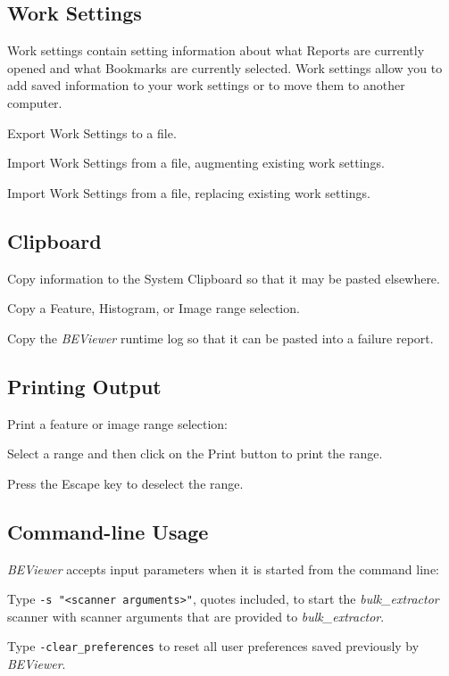 \documentclass[10pt,twoside]{article}
\newcommand{\bulk}{\emph{bulk\_extractor}\xspace}
\newcommand{\bev}{\emph{BEViewer}\xspace}
\begin{document}
\subsection{Work Settings}
Work settings contain setting information
about what Reports are currently opened and what Bookmarks are currently selected.
Work settings allow you to add saved information to your work settings
or to move them to another computer.
\begin{compactitem}
\item Export Work Settings to a file.
\item Import Work Settings from a file, augmenting existing work settings.
\item Import Work Settings from a file, replacing existing work settings.
\end{compactitem}
\subsection{Clipboard}
Copy information to the System Clipboard so that it may be pasted elsewhere.
\begin{compactitem}
\item Copy a Feature, Histogram, or Image range selection.
\item Copy the \bev runtime log so that it can be pasted into a failure report.
\end{compactitem}
\subsection{Printing Output}
Print a feature or image range selection:
\begin{compactitem}
\item Select a range and then click on the Print button to print the range.
\item Press the Escape key to deselect the range.
\end{compactitem}
\subsection{Command-line Usage}
\bev accepts input parameters when it is started from the command line:
\begin{compactitem}
\item Type \texttt{-s "<scanner arguments>"}, quotes included, to start the \bulk scanner
with scanner arguments that are provided to \bulk.
\item Type \texttt{-clear\_preferences} to reset all user preferences saved previously by \bev.
\end{compactitem}
\end{document}
